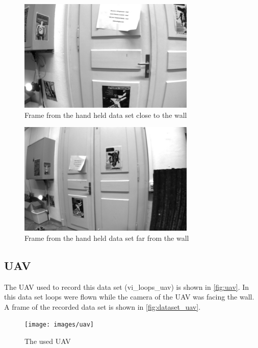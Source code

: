 \begin{figure}[H]
  \centering
  \includegraphics[width=0.75\textwidth]{images/frame0000}
  \caption{Frame from the hand held data set close to the wall}
  \label{fig:dataset_close}
\end{figure}

\begin{figure}[H]
  \centering
  \includegraphics[width=0.75\textwidth]{images/frame0014}
  \caption{Frame from the hand held data set far from the wall}
  \label{fig:dataset_far}
\end{figure}

\subsection{\acf{UAV}}
The \ac{UAV} used to record this data set (vi\_loops\_uav) is shown in \autoref{fig:uav}. In this data set loops were flown while the camera of the \ac{UAV} was facing the wall. A frame of the recorded data set is shown in \autoref{fig:dataset_uav}.

\begin{figure}[H]
  \centering
  \texttt{[image: images/uav]}
  \caption{The used \ac{UAV}}
  \label{fig:uav}
\end{figure}

